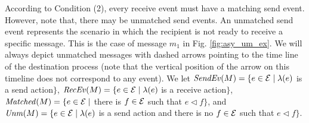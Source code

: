 According to Condition (2), every receive event must have a matching send event. However, note that, there may be unmatched send events. An unmatched send event represents the scenario in which the recipient is not ready to receive a specific message. This is the case of message $m_1 $ in  Fig. \ref{fig:asy_um_ex}.
We will always depict unmatched messages with dashed arrows pointing to the time line of the
destination process (note that the vertical position of the arrow on this timeline does not correspond to any event).
We let
$\mathit{SendEv}(M) = \{e \in \mathcal{E} \mid \lambda(e)$ is a send
action$\}$,
$\mathit{RecEv}(M) = \{e \in \mathcal{E} \mid \lambda(e)$ is a receive
action$\}$,
$\mathit{Matched}(M) = \{e \in \mathcal{E} \mid$ there is $f \in \mathcal{E}$
such that $e \lhd f\}$, and
$\mathit{Unm}(M) = \{e \in \mathcal{E} \mid \lambda(e)$ is a send
action and there is no $f \in \mathcal{E}$ such that $e \lhd f\}$.
%

